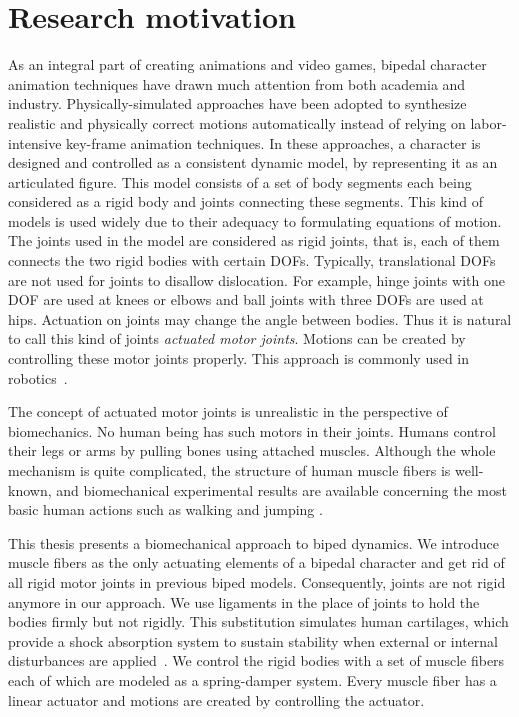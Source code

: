 \documentclass[master,english,final]{kaist-ucs}
\begin{document}
\section{Research motivation}
As an integral part of creating animations and video games,
bipedal character animation techniques have drawn much attention from
both academia and industry. Physically-simulated approaches have been
adopted to synthesize realistic and physically correct motions
automatically instead of relying on labor-intensive key-frame animation
techniques. In these approaches, a character is designed and controlled
as a consistent dynamic model, by representing it as an articulated
figure. This model consists of a set of body segments each being
considered as a rigid body and joints connecting these segments.
This kind of models is used widely due to their adequacy to formulating
equations of motion.
The joints used in the model are considered as rigid joints,
that is, each of them connects the two rigid bodies with certain DOFs.
Typically, translational DOFs are not used for joints to disallow dislocation.
For example, hinge joints with one DOF are used at knees or elbows and
ball joints with three DOFs are used at hips. Actuation on joints may change
the angle between bodies. Thus it is natural to call this kind of joints
\emph{actuated motor joints}. Motions can be created by
controlling these motor joints properly. This approach is
commonly used in robotics~\cite{sardain, goswami}.

The concept of actuated motor joints is unrealistic in the perspective of
biomechanics. No human being has such motors in their joints.
Humans control their legs or arms by pulling bones using attached
muscles. Although the whole mechanism is quite complicated,
the structure of human muscle fibers is well-known, and biomechanical
experimental results are available concerning the most basic human actions
such as walking and jumping \cite{citeulike:2547705, citeulike:7093575}.

This thesis presents a biomechanical approach to biped dynamics. We
introduce muscle fibers as the only actuating elements
of a bipedal character and get rid of all rigid motor joints in previous biped
models. Consequently, joints are not rigid anymore in our approach.
We use ligaments in the place of joints
to hold the bodies firmly but not rigidly. This substitution
simulates human cartilages, which provide a shock absorption
system to sustain stability when external or internal disturbances are applied~\cite{shock}.
We control the rigid bodies with a set of muscle fibers each of which are modeled as
a spring-damper system. Every muscle fiber has a linear actuator and
motions are created by controlling the actuator.
\end{document}
